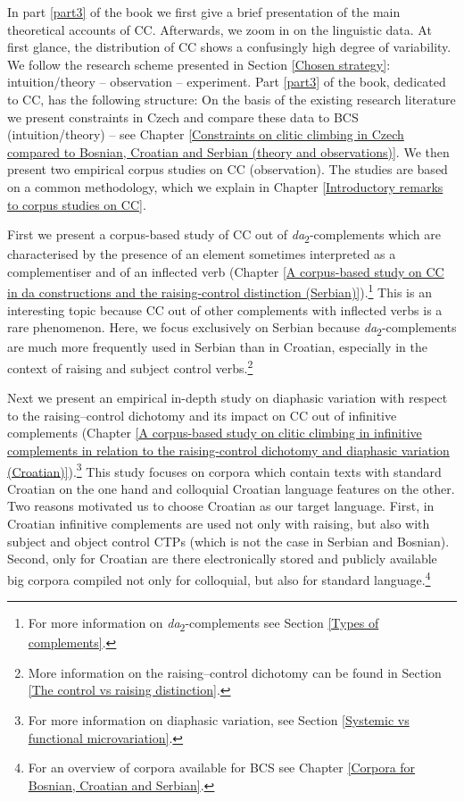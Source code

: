 In part \ref{part3} of the book we first give a brief presentation of the main theoretical accounts of CC. Afterwards, we zoom in on the linguistic data. At first glance, the distribution of CC shows a confusingly high degree of variability. We follow the research scheme presented in Section \ref{Chosen strategy}: intuition/theory – observation – experiment. Part \ref{part3} of the book, dedicated to CC, has the following structure: On the basis of the existing research literature we present constraints in Czech and compare these data to BCS (intuition/theory) – see Chapter \ref{Constraints on clitic climbing in Czech compared to Bosnian, Croatian and Serbian (theory and observations)}. We then present two empirical corpus studies on CC (observation). The studies are based on a common methodology, which we explain in Chapter \ref{Introductory remarks to corpus studies on CC}.

First we present a corpus-based study of CC out of \textit{da}\textsubscript{2}-complements which are characterised by the presence of an element sometimes interpreted as a complementiser and of an inflected verb (Chapter \ref{A corpus-based study on CC in da constructions and the raising-control distinction (Serbian)}).\footnote{For more information on \textit{da}\textsubscript{2}-complements see Section \ref{Types of complements}.} This is an interesting topic because CC out of other complements with inflected verbs is a rare phenomenon. Here, we focus exclusively on Serbian because \textit{da}\textsubscript{2}-complements are much more frequently used in Serbian than in Croatian, especially in the context of raising and subject control verbs.\footnote{More information on the raising--control dichotomy can be found in Section \ref{The control vs raising distinction}.}

Next we present an empirical in-depth study on diaphasic variation with respect to the raising--control dichotomy and its impact on CC out of infinitive complements (Chapter \ref{A corpus-based study on clitic climbing in infinitive complements in relation to the raising-control dichotomy and diaphasic variation (Croatian)}).\footnote{For more information on diaphasic variation, see Section \ref{Systemic vs functional microvariation}.} This study focuses on corpora which contain texts with standard Croatian on the one hand and colloquial Croatian language features on the other. Two reasons motivated us to choose Croatian as our target language. First, in Croatian infinitive complements are used not only with raising, but also with subject and object control CTPs (which is not the case in Serbian and Bosnian). Second, only for Croatian are there electronically stored and publicly available big corpora compiled not only for colloquial, but also for standard language.\footnote{For an overview of corpora available for BCS see Chapter \ref{Corpora for Bosnian, Croatian and Serbian}.}

